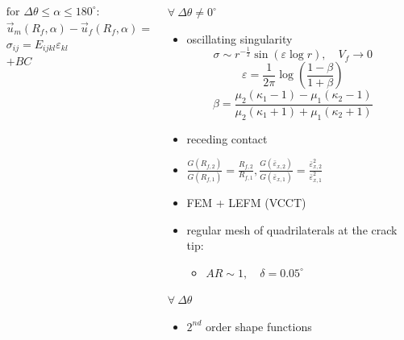 \documentclass[first,firstsupp,lastsupp,last,hyperref,table]{ETHclass}
\begin{document}
\begin{frame}
\begin{columns}
\begin{column}{0.6\textwidth}
\begin{columns}
\begin{column}{0.7\columnwidth}
\begin{equation*}
\begin{aligned}
&\text{for } \Delta\theta\leq\alpha\leq 180^{\circ}:\\
&\overrightarrow{u}_{m}\left(R_{f},\alpha\right)-\overrightarrow{u}_{f}\left(R_{f},\alpha\right)=0\\
&\sigma_{ij}=E_{ijkl}\varepsilon_{kl}\\
&+BC
\end{aligned}
\end{equation*}
\end{column}
\end{columns}
\end{column}
\begin{column}{0.375\textwidth}
\scriptsize
$\forall\ \Delta\theta\neq0^{\circ}$
\begin{itemize}[label=]
\item oscillating singularity
\vspace{-0.25cm}
\begin{equation*}
\sigma\sim r^{-\frac{1}{2}}\sin\left(\varepsilon\log r\right),\quad V_{f}\rightarrow 0
\end{equation*}
{\tiny
\begin{equation*}
\varepsilon=\frac{1}{2\pi}\log\left(\frac{1-\beta}{1+\beta}\right)
\end{equation*}
\begin{equation*}
\beta=\frac{\mu_{2}\left(\kappa_{1}-1\right)-\mu_{1}\left(\kappa_{2}-1\right)}{\mu_{2}\left(\kappa_{1}+1\right)+\mu_{1}\left(\kappa_{2}+1\right)}
\end{equation*}}
\item receding contact
\item $\frac{G\left(R_{f,2}\right)}{G\left(R_{f,1}\right)}=\frac{R_{f,2}}{R_{f,1}},\frac{G\left(\bar{\varepsilon}_{x,2}\right)}{G\left(\bar{\varepsilon}_{x,1}\right)}=\frac{\bar{\varepsilon}^{2}_{x,2}}{\bar{\varepsilon}^{2}_{x,1}}$
\item FEM + LEFM (VCCT)
\item regular mesh of quadrilaterals at the crack tip:
\begin{itemize}[label=-]
\item $AR\sim 1,\quad\delta=0.05^{\circ}$
\end{itemize}
\end{itemize}
$\forall\ \Delta\theta$
\begin{itemize}[label=]
\item $2^{nd}$ order shape functions
\end{itemize}
\end{column}
\end{columns}
\end{frame}
\end{document}
